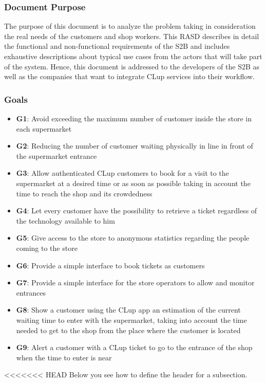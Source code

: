 \subsubsection{Document Purpose}

The purpose of this document is to analyze the problem taking in consideration the real needs of the customers and shop workers.
This RASD describes in detail the functional and non-functional requirements of the S2B and includes exhaustive descriptions about typical use cases from the actors that will take part of the system.
Hence, this document is addressed to the developers of the S2B as well as the companies that want to integrate CLup services into their workflow.

\vfill

\pagebreak

\subsubsection{Goals}
\begin{itemize}

      \item \textbf{G1}: Avoid exceeding the maximum number of customer inside the store in each supermarket

      \item \textbf{G2}: Reducing the number of customer waiting physically in line in front of the supermarket entrance

      \item \textbf{G3}: Allow authenticated CLup customers to book for a visit to the supermarket at a desired time or as soon as possible taking in account the time to reach the shop and its crowdedness

      \item \textbf{G4}: Let every customer have the possibility to retrieve a ticket regardless of the technology available to him

      \item \textbf{G5}: Give access to the store to anonymous statistics regarding the people coming to the store

      \item \textbf{G6}: Provide a simple interface to book tickets as customers

      \item \textbf{G7}: Provide a simple interface for the store operators to allow and monitor entrances

      \item \textbf{G8}: Show a customer using the CLup app an estimation of the current waiting time to enter with the supermarket, taking into account the time needed to get to the shop from the place where the customer is located

      \item \textbf{G9}: Alert a customer with a CLup ticket to go to the entrance of the shop when the time to enter is near
\end{itemize}
<<<<<<< HEAD
Below you see how to define the header for a subsection.
